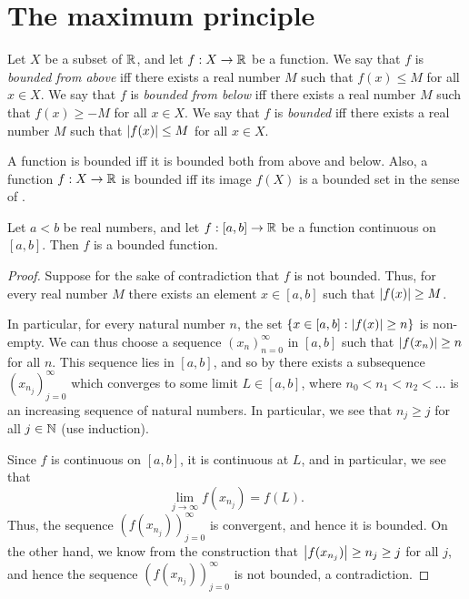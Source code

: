 \section{The maximum principle}\label{i:sec:9.6}

\begin{defn}\label{i:9.6.1}
  Let \(X\) be a subset of \(\mathbb{R}\), and let \(f : X \to \mathbb{R}\) be a function.
  We say that \(f\) is \emph{bounded from above} iff there exists a real number \(M\) such that \(f(x) \leq M\) for all \(x \in X\).
  We say that \(f\) is \emph{bounded from below} iff there exists a real number \(M\) such that \(f(x) \geq -M\) for all \(x \in X\).
  We say that \(f\) is \emph{bounded} iff there exists a real number \(M\) such that \(\left\lvert f(x)\right\rvert \leq M\) for all \(x \in X\).
\end{defn}

\begin{rmk}\label{i:9.6.2}
  A function is bounded iff it is bounded both from above and below.
  Also, a function \(f : X \to \mathbb{R}\) is bounded iff its image \(f(X)\) is a bounded set in the sense of .
\end{rmk}

\begin{lem}\label{i:9.6.3}
  Let \(a < b\) be real numbers, and let \(f : [a, b] \to \mathbb{R}\) be a function continuous on \([a, b]\).
  Then \(f\) is a bounded function.
\end{lem}

\begin{proof}
  Suppose for the sake of contradiction that \(f\) is not bounded.
  Thus, for every real number \(M\) there exists an element \(x \in [a, b]\) such that \(\left\lvert f(x)\right\rvert \geq M\).

  In particular, for every natural number \(n\), the set \(\left\lbrace x \in [a, b] : \left\lvert f(x)\right\rvert \geq n\right\rbrace\) is non-empty.
  We can thus choose a sequence \((x_n)_{n = 0}^\infty\) in \([a, b]\) such that \(\left\lvert f(x_n)\right\rvert \geq n\) for all \(n\).
  This sequence lies in \([a, b]\), and so by  there exists a subsequence \((x_{n_j})_{j = 0}^\infty\) which converges to some limit \(L \in [a, b]\), where \(n_0 < n_1 < n_2 < \dots\) is an increasing sequence of natural numbers.
  In particular, we see that \(n_j \geq j\) for all \(j \in \mathbb{N}\) (use induction).

  Since \(f\) is continuous on \([a, b]\), it is continuous at \(L\), and in particular, we see that
  \[
    \lim_{j \to \infty} f(x_{n_j}) = f(L).
  \]
  Thus, the sequence \((f(x_{n_j}))_{j = 0}^\infty\) is convergent, and hence it is bounded.
  On the other hand, we know from the construction that \(\left\lvert f(x_{n_j})\right\rvert \geq n_j \geq j\) for all \(j\), and hence the sequence \((f(x_{n_j}))_{j = 0}^\infty\) is not bounded, a contradiction.
\end{proof}

